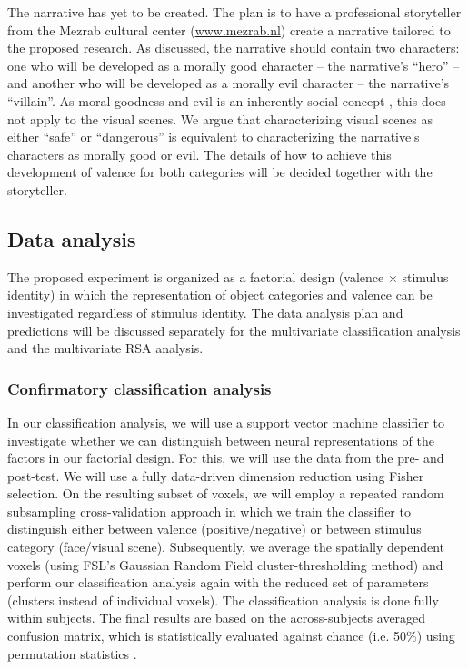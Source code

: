 \documentclass[12pt,a4paper]{article}\usepackage[]{graphicx}\usepackage[]{color}
\begin{document}
The narrative has yet to be created. The plan is to have a professional storyteller from the Mezrab cultural center (\url{www.mezrab.nl}) create a narrative tailored to the proposed research. As discussed, the narrative should contain two characters: one who will be developed as a morally good character -- the narrative's ``hero'' -- and another who will be developed as a morally evil character -- the narrative's ``villain''. As moral goodness and evil is an inherently social concept \citep{greene2002}, this does not apply to the visual scenes. We argue that characterizing visual scenes as either ``safe'' or ``dangerous'' is equivalent to characterizing the narrative's characters as morally good or evil. The details of how to achieve this development of valence for both categories will be decided together with the storyteller. 

\subsection{Data analysis}
The proposed experiment is organized as a factorial design (valence $\times$ stimulus identity) in which the representation of object categories and valence can be investigated regardless of stimulus identity. The data analysis plan and predictions will be discussed separately for the multivariate classification analysis and the multivariate RSA analysis.

\subsubsection{Confirmatory classification analysis}
In our classification analysis, we will use a support vector machine classifier to investigate whether we can distinguish between neural representations of the factors in our factorial design. For this, we will use the data from the pre- and post-test. We will use a fully data-driven dimension reduction using Fisher selection. On the resulting subset of voxels, we will employ a repeated random subsampling cross-validation approach in which we train the classifier to distinguish either between valence (positive/negative) or between stimulus category (face/visual scene). Subsequently, we average the spatially dependent voxels (using FSL's Gaussian Random Field cluster-thresholding method) and perform our classification analysis again with the reduced set of parameters (clusters instead of individual voxels). The classification analysis is done fully within subjects. The final results are based on the across-subjects averaged confusion matrix, which is statistically evaluated against chance (i.e. 50\%) using permutation statistics \citep{nichols2002}.     
\end{document}
